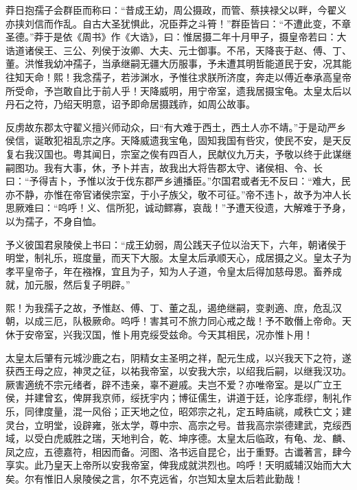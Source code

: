 \documentclass[12pt,UTF8]{ctexbook}
\begin{document}
莽日抱孺子会群臣而称曰：“昔成王幼，周公摄政，而管、蔡挟禄父以畔，今翟义亦挟刘信而作乱。自古大圣犹惧此，况臣莽之斗筲！”群臣皆曰：“不遭此变，不章圣德。”莽于是依《周书》作《大诰》，曰：惟居摄二年十月甲子，摄皇帝若曰：大诰道诸侯王、三公、列侯于汝卿、大夫、元士御事。不吊，天降丧于赵、傅、丁、董。洪惟我幼冲孺子，当承继嗣无疆大历服事，予未遭其明哲能道民于安，况其能往知天命！熙！我念孺子，若涉渊水，予惟往求朕所济度，奔走以傅近奉承高皇帝所受命，予岂敢自比于前人乎！天降威明，用宁帝室，遗我居摄宝龟。太皇太后以丹石之符，乃绍天明意，诏予即命居摄践祚，如周公故事。



反虏故东郡太守翟义擅兴师动众，曰“有大难于西土，西土人亦不靖。”于是动严乡侯信，诞敢犯祖乱宗之序。天降威遗我宝龟，固知我国有呰灾，使民不安，是天反复右我汉国也。粤其闻日，宗室之俟有四百人，民献仪九万夫，予敬以终于此谋继嗣图功。我有大事，休，予卜并吉，故我出大将告郡太守、诸侯相、令、长曰：“予得吉卜，予惟以汝于伐东郡严乡逋播臣。”尔国君或者无不反曰：“难大，民亦不静，亦惟在帝官诸侯宗室，于小子族父，敬不可征。”帝不违卜，故予为冲人长思厥难曰：“呜呼！义、信所犯，诚动鳏寡，哀哉！”予遭天役遗，大解难于予身，以为孺子，不身自恤。



予义彼国君泉陵侯上书曰：“成王幼弱，周公践天子位以治天下，六年，朝诸侯于明堂，制礼乐，班度量，而天下大服。太皇太后承顺天心，成居摄之义。皇太子为孝平皇帝子，年在襁褓，宜且为子，知为人子道，令皇太后得加慈母恩。畜养成就，加元服，然后复子明辟。”



熙！为我孺子之故，予惟赵、傅、丁、董之乱，遏绝继嗣，变剥適、庶，危乱汉朝，以成三厄，队极厥命。呜呼！害其可不旅力同心戒之哉！予不敢僭上帝命。天休于安帝室，兴我汉国，惟卜用克绥受兹命。今天其相民，况亦惟卜用！



太皇太后肇有元城沙鹿之右，阴精女主圣明之祥，配元生成，以兴我天下之符，遂获西王母之应，神灵之征，以祐我帝室，以安我大宗，以绍我后嗣，以继我汉功。厥害適统不宗元绪者，辟不违亲，辜不避戚。夫岂不爱？亦唯帝室。是以广立王侯，并建曾玄，俾屏我京师，绥抚宇内；博征儒生，讲道于廷，论序乖缪，制礼作乐，同律度量，混一风俗；正天地之位，昭郊宗之礼，定五畤庙祧，咸秩亡文；建灵台，立明堂，设辟雍，张太学，尊中宗、高宗之号。昔我高宗崇德建武，克绥西域，以受白虎威胜之瑞，天地判合，乾、坤序德。太皇太后临政，有龟、龙、麟、凤之应，五德嘉符，相因而备。河图、洛书远自昆仑，出于重野。古谶著言，肆今享实。此乃皇天上帝所以安我帝室，俾我成就洪烈也。呜呼！天明威辅汉始而大大矣。尔有惟旧人泉陵侯之言，尔不克远省，尔岂知太皇太后若此勤哉！
\end{document}
